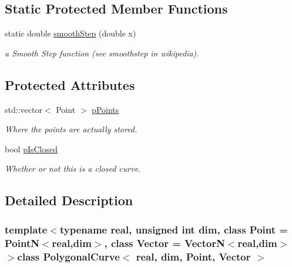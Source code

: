 \subsection*{Static Protected Member Functions}
\begin{DoxyCompactItemize}
\item 
static double \hyperlink{classPolygonalCurve_a43e006d7da7359e205d6cb5a1b05853f}{smoothStep} (double x)
\begin{DoxyCompactList}\small\item\em a Smooth Step function (see smoothstep in wikipedia). \end{DoxyCompactList}\end{DoxyCompactItemize}
\subsection*{Protected Attributes}
\begin{DoxyCompactItemize}
\item 
\hypertarget{classPolygonalCurve_a87c9a2a64525ef10df36b714e88f70f6}{
std::vector$<$ Point $>$ \hyperlink{classPolygonalCurve_a87c9a2a64525ef10df36b714e88f70f6}{pPoints}}
\label{classPolygonalCurve_a87c9a2a64525ef10df36b714e88f70f6}

\begin{DoxyCompactList}\small\item\em Where the points are actually stored. \end{DoxyCompactList}\item 
\hypertarget{classPolygonalCurve_a360f87944c2726602c44952b3070d1ea}{
bool \hyperlink{classPolygonalCurve_a360f87944c2726602c44952b3070d1ea}{pIsClosed}}
\label{classPolygonalCurve_a360f87944c2726602c44952b3070d1ea}

\begin{DoxyCompactList}\small\item\em Whether or not this is a closed curve. \end{DoxyCompactList}\end{DoxyCompactItemize}


\subsection{Detailed Description}
\subsubsection*{template$<$typename real, unsigned int dim, class Point = PointN$<$real,dim$>$, class Vector = VectorN$<$real,dim$>$$>$class PolygonalCurve$<$ real, dim, Point, Vector $>$}

